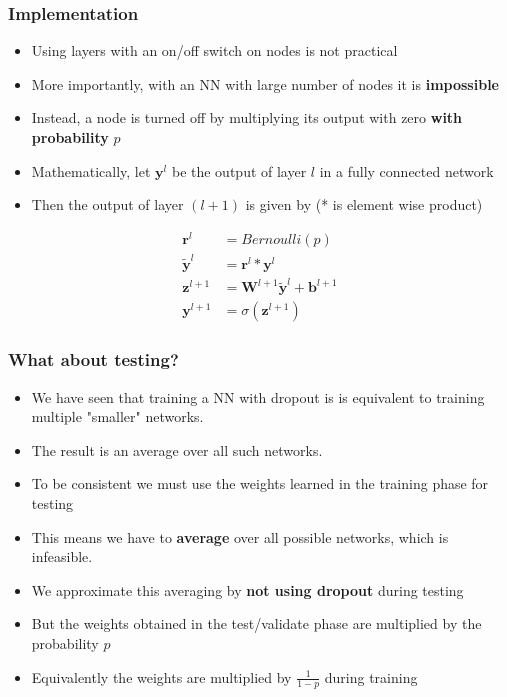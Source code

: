 \documentclass{beamer}
\begin{document}
\begin{frame}
    \frametitle{Implementation}
\begin{itemize}
    \item Using layers with an on/off switch on nodes is not practical 
    \item More importantly, with an NN with large number of nodes it is \textbf{impossible}
    \item Instead, a node is turned off by multiplying its output with zero \textbf{with probability} $p$ 
    \item Mathematically, let $\mathbf{y}^{l}$ be the output of layer $l$ in a fully connected network
    \item Then the output of layer $(l+1)$ is given by  (* is element wise product)
\end{itemize}
    \begin{align*}
       \mathbf{r}^l&=Bernoulli(p)\\
        \mathbf{\tilde{y}}^l&=\mathbf{r}^l*\mathbf{y}^l\\
        \mathbf{z}^{l+1}&=\mathbf{W}^{l+1}\mathbf{\tilde{y}}^l+\mathbf{b}^{l+1}\\
        \mathbf{y}^{l+1}&=\sigma(\mathbf{z}^{l+1})
    \end{align*}

\end{frame}
\begin{frame}
    \frametitle{What about testing?}
    \begin{itemize}
        \item We have seen that training a NN with dropout is   is equivalent to training multiple "smaller" networks.
        \item The result is an average over all such networks.
        \item To be consistent we must use the weights learned in the training phase for testing
        \item This means we have to \textbf{average} over all possible networks, which is infeasible.
        \item We approximate this averaging by \textbf{not using dropout} during testing
        \item But the weights obtained in the test/validate phase are multiplied by the probability $p$
        \item Equivalently the weights are multiplied by $\frac{1}{1-p}$ during training
    \end{itemize}
    

\end{frame}
\end{document}
